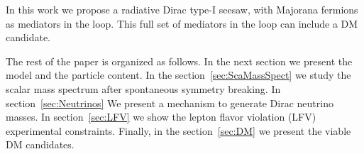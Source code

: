 \documentclass[12pt]{article}
\begin{document}
In this work we propose a radiative Dirac type-I seesaw, with Majorana
fermions as mediators in the loop. This full set of mediators in the
loop can include a DM candidate.

The rest of the paper is organized as follows. In the next section we present the model and the particle content. In the section~\ref{sec:ScaMassSpect} we study the scalar mass spectrum after spontaneous symmetry breaking. In section~\ref{sec:Neutrinos} We present a mechanism to generate Dirac neutrino masses. In section~\ref{sec:LFV} we show the lepton flavor violation (LFV) experimental  constraints. Finally, in the section~\ref{sec:DM} we present the viable DM candidates.
\end{document}
